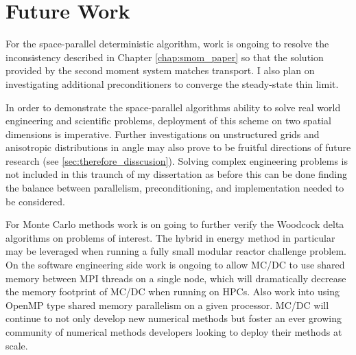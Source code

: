 \section{Future Work}

For the space-parallel deterministic algorithm, work is ongoing to resolve the inconsistency described in Chapter \ref{chap:smom_paper} so that the solution provided by the second moment system matches transport.
I also plan on investigating additional preconditioners to converge the steady-state thin limit.

In order to demonstrate the space-parallel algorithms ability to solve real world engineering and scientific problems, deployment of this scheme on two spatial dimensions is imperative.
Further investigations on unstructured grids and anisotropic distributions in angle may also prove to be fruitful directions of future research (see \ref{sec:therefore_disscusion}).
Solving complex engineering problems is not included in this traunch of my dissertation as before this can be done finding the balance between parallelism, preconditioning, and implementation needed to be considered.

For Monte Carlo methods work is on going to further verify the Woodcock delta algorithms on problems of interest.
The hybrid in energy method in particular may be leveraged when running a fully small modular reactor challenge problem.
On the software engineering side work is ongoing to allow MC/DC to use shared memory between MPI threads on a single node, which will dramatically decrease the memory footprint of MC/DC when running on HPCs.
Also work into using OpenMP type shared memory parallelism on a given processor.
MC/DC will continue to not only develop new numerical methods but foster an ever growing community of numerical methods developers looking to deploy their methods at scale.